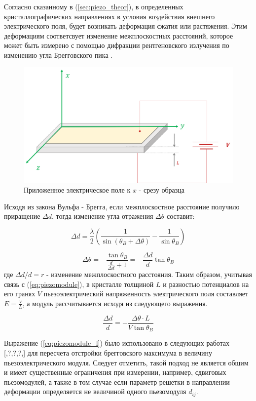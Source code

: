 Согласно сказанному в (\ref{sec:piezo_theor}), в определенных кристаллографических направлениях в
условия воздействия внешнего электрического поля, будет возникать деформация
сжатия или растяжения. Этим деформациям соответсвует изменение межплоскостных
 расстояний, которое может быть измерено с помощью дифракции рентгеновского
 излучения по изменению угла Брегговского пика \cite{marchenkov2014}.

 \begin{figure}[H]
   \centering
   \includegraphics[width=.4\textwidth]{images/piezo.png}
   \caption{Приложенное электрическое поле к $x$ - срезу образца}
   \label{ris:x_cut}
 \end{figure}
 
Исходя из закона Вульфа - Брегга, если межплоскостное расстояние получило приращение
$\Delta d$, тогда изменение угла отражения $\Delta \theta$ составит:

$$ \Delta d = \frac{\lambda}{2}\left( \frac{1}{\sin(\theta_B + \Delta \theta) } - \frac{1}{\sin \theta_B } \right) $$

\begin{equation}
   \Delta \theta =-  \frac{\tan \theta_B}{\frac{d}{\Delta d}+1}  = -  \frac{\Delta d }{d}  \tan \theta_B
\end{equation}
где $\Delta d/d = r$ - изменение межплоскостного расстояния. Таким образом, учитывая связь с
(\ref{eq:piezomodule}),  в кристалле толщиной $L$ и разностью потенциалов на его
гранях $V$ пьезоэлектрический
напряженность электрического поля составляет $E = \frac{V}{L}$, а модуль
 рассчитывается исходя из следующего выражения.

 \begin{equation}
    \frac{\Delta d}{d}  = -\frac{\Delta \theta \cdot L}{V \tan \theta_B}
    \label{eq:piezomodule_l}
 \end{equation}

Выражение (\ref{eq:piezomodule_l}) было использовано в следующих работах [,?,?,?,] для
пересчета отстройки брегговского максимума в величину пьезоэлектрического модуля.
Следует отметить, такой подход не является общим и имеет существенные ограничения при
измерении, например, сдвиговых пьезомодулей, а также в том случае если параметр решетки
в направлении деформации определяется не величиной одного пьезомодуля $d_{ij}$.

